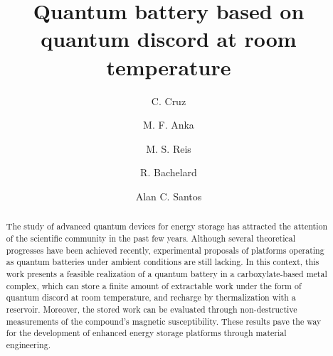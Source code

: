 \documentclass[aps,prl,epsfigure,twocolumn,superscriptaddress]{revtex4-1}
\newcommand{\1}{\mathbbm{1}}
\begin{document}
\title{Quantum battery based on quantum discord at room temperature}


\author{C. Cruz}
%
\author{M. F. Anka}
%
\author{M. S. Reis}

\author{R. Bachelard}

\author{Alan C. Santos}



\begin{abstract}
	{The study of advanced quantum devices for energy storage has attracted the attention of the scientific community in the past few years. Although several theoretical progresses have been achieved recently, experimental proposals of platforms operating as quantum batteries under ambient conditions are still lacking. In this context, this work presents a feasible realization of a quantum battery in a carboxylate-based metal complex, which can store a finite amount of extractable work under the form of quantum discord at room temperature, and recharge by thermalization with a reservoir. Moreover, the stored work can be evaluated through non-destructive measurements of the compound's magnetic susceptibility. These results pave the way for the development of enhanced energy storage platforms through material engineering.}
\end{abstract}
\maketitle
\end{document}
